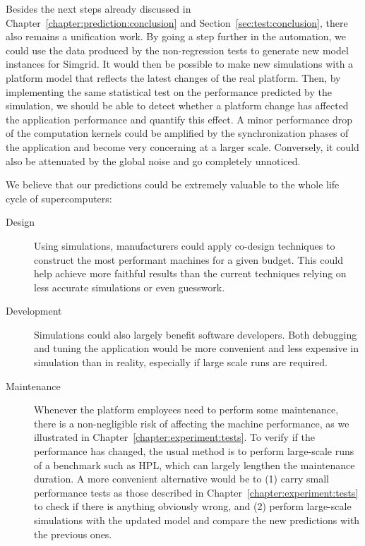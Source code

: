         Besides the next steps already discussed in Chapter~\ref{chapter:prediction:conclusion} and
        Section~\ref{sec:test:conclusion}, there also remains a unification work. By going a step further in the
        automation, we could use the data produced by the non-regression tests to generate new model instances for
        Simgrid. It would then be possible to make new simulations with a platform model that reflects the latest
        changes of the real platform. Then, by implementing the same statistical test on the performance predicted by
        the simulation, we should be able to detect whether a platform change has affected the application
        performance and quantify this effect. A minor performance drop of the computation kernels could be amplified by
        the synchronization phases of the application and become very concerning at a larger scale. Conversely, it could
        also be attenuated by the global noise and go completely unnoticed.

        We believe that our predictions could be extremely valuable to the whole life cycle of supercomputers:
        \begin{description}
            \item[Design] Using simulations, manufacturers could apply co-design techniques to construct the most
                performant machines for a given budget. This could help achieve more faithful results than the current
                techniques relying on less accurate simulations or even guesswork.
            \item[Development] Simulations could also largely benefit software developers. Both debugging and tuning the
                application would be more convenient and less expensive in simulation than in reality, especially if
                large scale runs are required.
            \item[Maintenance] Whenever the platform employees need to perform some maintenance, there is a
                non-negligible risk of affecting the machine performance, as we illustrated in
                Chapter~\ref{chapter:experiment:tests}. To verify if the performance has changed, the usual method is to
                perform large-scale runs of a benchmark such as HPL, which can largely lengthen the maintenance
                duration. A more convenient alternative would be to (1) carry small performance tests as those
                described in Chapter~\ref{chapter:experiment:tests} to check if there is anything obviously wrong, and
                (2) perform large-scale simulations with the updated model and compare the new predictions with the
                previous ones.
        \end{description}
